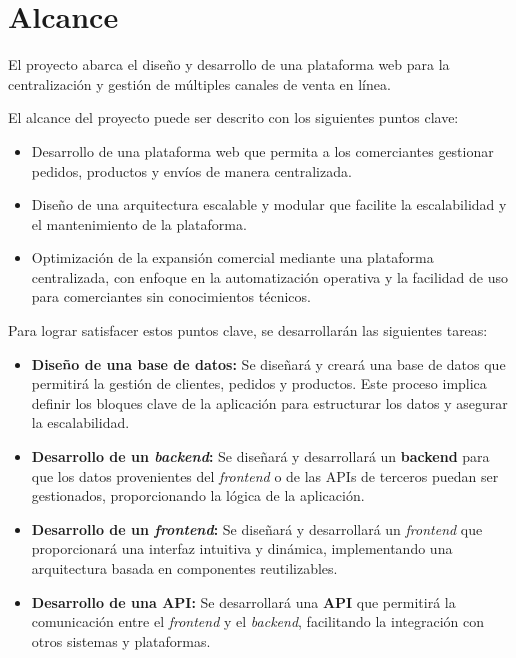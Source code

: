 \section{Alcance}
\label{intro:sec:alcance}

El proyecto abarca el diseño y desarrollo de una plataforma web para la centralización y gestión de múltiples canales de venta en línea.

El alcance del proyecto puede ser descrito con los siguientes puntos clave:

\begin{itemize}
    \item Desarrollo de una plataforma web que permita a los comerciantes gestionar pedidos, productos y envíos de manera centralizada.
    \item Diseño de una arquitectura escalable y modular que facilite la escalabilidad y el mantenimiento de la plataforma.
    \item Optimización de la expansión comercial mediante una plataforma centralizada, con enfoque en la automatización operativa y la facilidad de uso para comerciantes sin conocimientos técnicos.
\end{itemize}

Para lograr satisfacer estos puntos clave, se desarrollarán las siguientes tareas:

\begin{itemize}
    \item \textbf{Diseño de una base de datos:} Se diseñará y creará una base de datos que permitirá la gestión de clientes, pedidos y productos. Este proceso implica definir los bloques clave de la aplicación para estructurar los datos y asegurar la escalabilidad.
    \item \textbf{Desarrollo de un \textit{backend}:} Se diseñará y desarrollará un \textbf{backend} para que los datos provenientes del \textit{frontend} o de las APIs de terceros puedan ser gestionados, proporcionando la lógica de la aplicación.
    \item \textbf{Desarrollo de un \textit{frontend}:} Se diseñará y desarrollará un \textit{frontend} que proporcionará una interfaz intuitiva y dinámica, implementando una arquitectura basada en componentes reutilizables.
    \item \textbf{Desarrollo de una API:} Se desarrollará una \textbf{API} que permitirá la comunicación entre el \textit{frontend} y el \textit{backend}, facilitando la integración con otros sistemas y plataformas.
\end{itemize}

